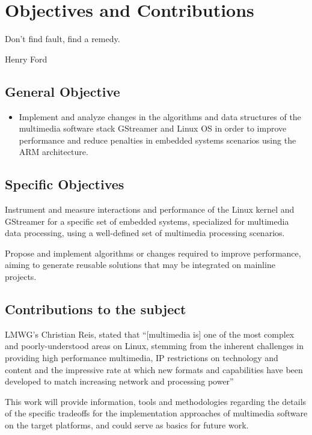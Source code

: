 \chapter{Objectives and Contributions}
\epigraph{Don't find fault, find a remedy.}{Henry Ford}

\section{General Objective}

\begin{itemize}
\item Implement and analyze changes in the algorithms and data structures of the multimedia software stack GStreamer and Linux \acl{OS} in order to improve performance and reduce penalties in embedded systems scenarios using the \ac{ARM} architecture.
\end{itemize}

\section{Specific Objectives}
\begin{itemize*}
\item Instrument and measure interactions and performance of the Linux kernel and GStreamer for a specific set of embedded systems, specialized for multimedia data processing, using a well-defined set of multimedia processing scenarios.
\item Propose and implement algorithms or changes required to improve performance, aiming to generate reusable solutions that may be integrated on mainline projects.
\end{itemize*}

\section{Contributions to the subject}
\ac{LMWG}'s Christian Reis, stated that ``[multimedia is] one of the most complex and poorly-understood areas on Linux, stemming from the inherent challenges in providing high performance multimedia, IP restrictions on technology and content and the impressive rate at which new formats and capabilities have been developed to match increasing network and processing power'' \cite{Reis:vn}

This work will provide information, tools and methodologies regarding the details of the specific tradeoffs for the implementation approaches of multimedia software on the target platforms, and could serve as basics for future work.

